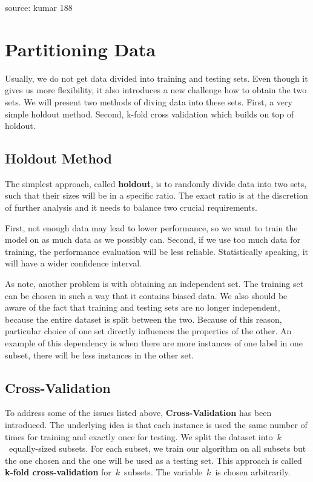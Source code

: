 {source: kumar 188}


\section{Partitioning Data}

Usually, we do not get data divided into training and testing sets.
Even though it gives us more flexibility, it also introduces a new challenge how to obtain the two sets.
We will present two methods of diving data into these sets.
First, a very simple holdout method.
Second, k-fold cross validation which builds on top of holdout.

\subsection{Holdout Method}

The simplest approach, called \textbf{holdout}, is to randomly divide data into two sets,
such that their sizes will be in a specific ratio.
The exact ratio is at the discretion of further analysis and it needs to balance two crucial requirements.

First, not enough data may lead to lower performance, so we want to train the model on as much data as we possibly can.
Second, if we use too much data for training, the performance evaluation will be less reliable.
Statistically speaking, it will have a wider confidence interval.

As \citet{TanBachKum08} note, another problem is with obtaining an independent set.
The training set can be chosen in such a way that it contains biased data.
We also should be aware of the fact that training and testing sets are no longer independent,
because the entire dataset is split between the two.
Because of this reason, particular choice of one set directly influences the properties of the other.
An example of this dependency is
when there are more instances of one label in one subset,
there will be less instances in the other set.


\subsection{Cross-Validation}

To address some of the issues listed above, {\bf Cross-Validation} has been introduced.
The underlying idea is that each instance is used the same number of times for training 
and exactly once for testing.
We split the dataset into~$k$~equally-sized subsets.
For each subset, we train our algorithm on all subsets but the one chosen 
and the one will be used as a testing set.
This approach is called {\bf k-fold cross-validation} for~$k$~subsets.
The variable~$k$~is chosen arbitrarily.

